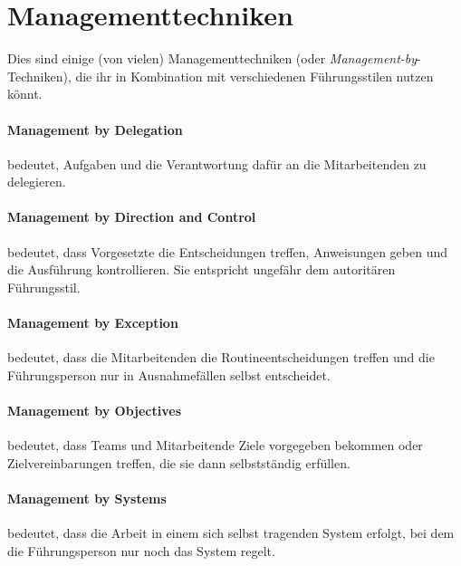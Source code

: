 \section{Managementtechniken}
\label{managementtechniken}

Dies sind einige (von vielen) Managementtechniken (oder \emph{Management-by}-Techniken), die ihr in Kombination mit verschiedenen Führungsstilen nutzen könnt.

\paragraph{Management by Delegation} bedeutet, Aufgaben und die Verantwortung dafür an die Mitarbeitenden zu delegieren.

\paragraph{Management by Direction and Control} bedeutet, dass Vorgesetzte die Entscheidungen treffen, Anweisungen geben und die Ausführung kontrollieren. Sie entspricht ungefähr dem autoritären Führungsstil.

\paragraph{Management by Exception} bedeutet, dass die Mitarbeitenden die Routineentscheidungen treffen und die Führungsperson nur in Ausnahmefällen selbst entscheidet.

\paragraph{Management by Objectives} bedeutet, dass Teams und Mitarbeitende Ziele vorgegeben bekommen oder Zielvereinbarungen treffen, die sie dann selbstständig erfüllen.

\paragraph{Management by Systems} bedeutet, dass die Arbeit in einem sich selbst tragenden System erfolgt, bei dem die Führungsperson nur noch das System regelt.
